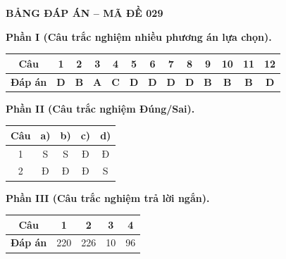 \vspace{0.4cm}
\noindent\begin{minipage}{\linewidth}
\begin{center}{\large\bfseries\color{red!80!black} BẢNG ĐÁP ÁN -- MÃ ĐỀ 029}\end{center}
\vspace{0.15cm}
\noindent\textbf{Phần I (Câu trắc nghiệm nhiều phương án lựa chọn).}\par\smallskip
\begin{center}
\begin{tabular}{|c|c|c|c|c|c|c|c|c|c|c|c|c|}\hline
\textbf{Câu} & 1 & 2 & 3 & 4 & 5 & 6 & 7 & 8 & 9 & 10 & 11 & 12 \\ \hline
\textbf{Đáp án} & \textbf{D} & \textbf{B} & \textbf{A} & \textbf{C} & \textbf{D} & \textbf{D} & \textbf{D} & \textbf{D} & \textbf{B} & \textbf{B} & \textbf{B} & \textbf{D} \\ \hline
\end{tabular}
\end{center}
\noindent\textbf{Phần II (Câu trắc nghiệm Đúng/Sai).}\par\smallskip
\begin{center}
\begin{tabular}{|c|c|c|c|c|}\hline
\textbf{Câu} & \textbf{a)} & \textbf{b)} & \textbf{c)} & \textbf{d)} \\ \hline
1 & S & S & Đ & Đ \\ \hline
2 & Đ & Đ & Đ & S \\ \hline
\end{tabular}
\end{center}
\noindent\textbf{Phần III (Câu trắc nghiệm trả lời ngắn).}\par\smallskip
\begin{center}
\begin{tabular}{|c|c|c|c|c|}\hline
\textbf{Câu} & 1 & 2 & 3 & 4 \\ \hline
\textbf{Đáp án} & 220 & 226 & 10 & 96 \\ \hline
\end{tabular}
\end{center}
\end{minipage}
